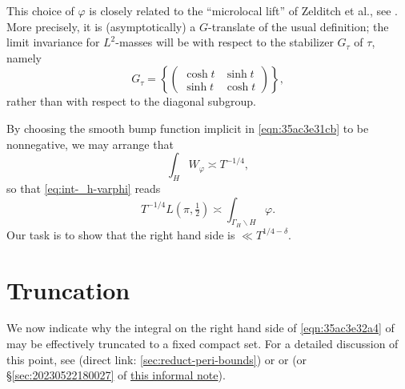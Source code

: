 \documentclass[reqno]{amsart} 
\numberwithin{equation}{section}
\begin{document}
\begin{remark}
  This choice of $\varphi$ is closely related to the ``microlocal lift'' of Zelditch \cite{MR916129} et al., see \cite{MR1859345, MR2346281, MR2314452}.  More precisely, it is (asymptotically) a $G$-translate of the usual definition; the limit invariance for $L^2$-masses will be with respect to the stabilizer $G_\tau$ of $\tau$, namely
\begin{equation}\label{eqn:G-tau}
  G_\tau = \left\{ \begin{pmatrix}
      \cosh t & \sinh t \\
      \sinh t & \cosh t
    \end{pmatrix} \right\},
\end{equation}
rather than with respect to the diagonal subgroup.
\end{remark}

By choosing the smooth bump function implicit in \eqref{eqn:35ac3e31cb} to be nonnegative, we may arrange that
\begin{equation*}
  \int_{H} W_\varphi \asymp  T^{-1/4},
\end{equation*}
so that \eqref{eq:int-_h-varphi} reads
\begin{equation}\label{eqn:35ac3e32a4}
  T^{-1/4} L(\pi,\tfrac{1}{2}) \asymp  \int_{\Gamma_{H} \backslash H} \varphi.
\end{equation}
Our task is to show that the right hand side is $\ll T^{1/4-\delta}$.


\section{Truncation}\label{sec:orgc98f847}
We now indicate why the integral on the right hand side of \eqref{eqn:35ac3e32a4} of may be effectively truncated to a fixed compact set.  For a detailed discussion of this point, see \cite[\S5.3]{2021arXiv210915230N} (direct link: \ref{sec:reduct-peri-bounds}) or \cite[\S5.1.4]{michel-2009} or \cite[\S3]{2020arXiv200406791S} (or \S\ref{sec:20230522180027} of \href{20230522T174726__shrinking-archimedean-families-second-moment-gl2.pdf}{this informal note}).
\end{document}
